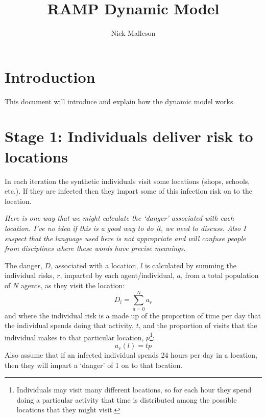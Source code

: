 \documentclass{article}
\title{RAMP Dynamic Model}
\author{Nick Malleson}
\date{}
\begin{document}
\maketitle
\tableofcontents


\section{Introduction}

This document will introduce and explain how the dynamic model works.

\section{Stage 1: Individuals deliver risk to locations}

In each iteration the synthetic individuals visit some locations (shops, schools, etc.).
If they are infected then they impart some of this infection risk on to the location.

\textit{Here is one way that we might calculate the `danger' associated with each location. I've no idea if this is a good way to do it, we need to discuss. Also I suspect that the language used here is not appropriate and will confuse people from disciplines where these words have precise meanings.}

The danger, $D$, associated with a location, $l$ is calculated by summing the individual risks, $r$, imparted by each agent/individual, $a$, from a total population of $N$ agents, as they visit the location:
\begin{equation}
  D_l = \sum_{a=0}^{N}  a_r  
\end{equation}
and where the individual risk is a made up of the proportion of time per day that the individual spends doing that activity, $t$, and the proportion of visits that the individual makes to that particular location, $p$\footnote{Individuals may visit many different locations, so for each hour they spend doing a particular activity that time is distributed among the possible locations that they might visit.}:
\begin{equation}
  a_r(l) =  t  p  
\end{equation}
Also assume that if an infected individual spends 24 hours per day in a location, then they will impart a `danger' of 1 on to that location. 
\end{document}
